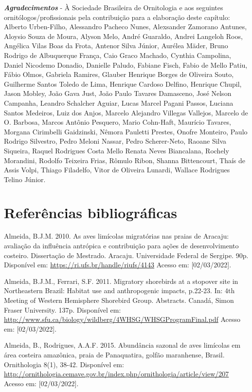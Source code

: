 \documentclass[
  oneside]{scrbook}
\begin{document}
\textbf{\emph{Agradecimentos}} - À Sociedade Brasileira de Ornitologia e aos seguintes ornitólogos/profissionais pela contribuição para a elaboração deste capítulo:
Alberto Urben-Filho,
Alessandro Pacheco Nunes,
Alexsander Zamorano Antunes,
Aloysio Souza de Moura,
Alyson Melo,
André Guaraldo,
Andrei Langeloh Roos,
Angélica Vilas Boas da Frota,
Antenor Silva Júnior,
Aurélea Mäder,
Bruno Rodrigo de Albuquerque França,
Caio Graco Machado,
Cynthia Campolina,
Daniel Nicodemo Donadio,
Danielle Paludo,
Fabiane Fisch,
Fabio de Mello Patiu,
Fábio Olmos,
Gabriela Ramires,
Glauber Henrique Borges de Oliveira Souto,
Guilherme Santos Toledo de Lima,
Henrique Cardoso Delfino,
Henrique Chupil,
Jason Mobley,
João Gava Just,
João Paulo Tavares Damasceno,
José Nelson Campanha,
Leandro Schalcher Aguiar,
Lucas Marcel Pagani Passos,
Luciana Santos Medeiros,
Luiz dos Anjos,
Marcelo Alejandro Villegas Vallejos,
Marcelo de O. Barbosa,
Marcos Antônio Pesquero,
Mario Cohn-Haft,
Maurício Tavares,
Morgana Cirimbelli Gaidzinski,
Nêmora Pauletti Prestes,
Onofre Monteiro,
Paulo Rodrigo Silvestro,
Pedro Meloni Nassar,
Pedro Scherer-Neto,
Raoane Silva Siqueira,
Raquel Rodrigues Costa Mello
Renata Neves Biancalana,
Rochely Morandini,
Rodolfo Teixeira Frias,
Rômulo Ribon,
Shanna Bittencourt,
Thaís de Assis Volpi,
Thiago Filadelfo,
Vitor de Oliveira Lunardi,
Wallace Rodrigues Telino Júnior.

\hypertarget{referuxeancias-bibliogruxe1ficas-6}{%
\section{Referências bibliográficas}\label{referuxeancias-bibliogruxe1ficas-6}}

Almeida, B.J.M. 2010. As aves limícolas migratórias nas praias de Aracaju: avaliação da influência antrópica e contribuição para ações de desenvolvimento costeiro. Dissertação de Mestrado. Aracaju. Universidade Federal de Sergipe. 90p. Disponível em: \url{https://ri.ufs.br/handle/riufs/4143} Acesso em: {[}02/03/2022{]}.

Almeida, B.J.M., Ferrari, S.F. 2011. Migratory shorebirds at a stopover site in Northeastern Brazil: Habitat use and anthropogenic impacts, p.22-23. In: 4th Meeting of Western Hemisphere Shorebird Group. Abstracts. Canadá, Simon Fraser University. 137p. Disponível em: \url{http://www.sfu.ca/biology/wildberg/4WHSG/WHSGProgramFinal.pdf} Acesso em: {[}02/03/2022{]}.

Almeida, B., Rodrigues, A.A.F. 2015. Abundância sazonal de aves limícolas em área costeira amazônica, praia de Panaquatira, golfão maranhense, Brasil. Ornithologia 8(1), 38-42. Disponível em: \url{http://ornithologia.cemave.gov.br/index.php/ornithologia/article/view/207} Acesso em: {[}02/03/2022{]}.
\end{document}
